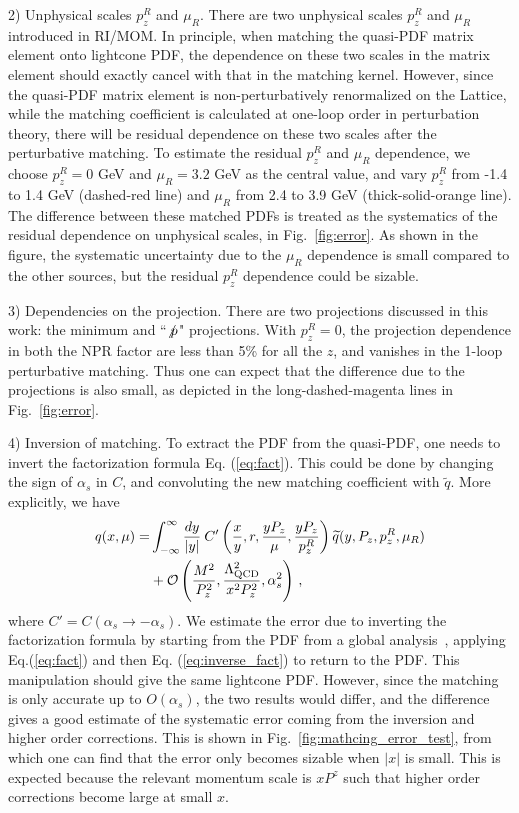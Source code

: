  {2) Unphysical scales $p_z^R$ and $\mu_R$. There are two unphysical scales $p_z^R$ and $\mu_R$ introduced in RI/MOM.  In principle, when matching the quasi-PDF matrix element onto lightcone PDF, the dependence on these two scales  in the matrix element   should exactly  cancel with that in the matching kernel.  However, since the quasi-PDF matrix element is non-perturbatively renormalized  on the Lattice, while the matching coefficient is  calculated at one-loop order in perturbation theory, there will be residual dependence on these two scales after the perturbative matching. To estimate the residual $p_z^R$ and $\mu_R$ dependence, we choose   {$p_z^R=0$ GeV and $\mu_R=3.2$ GeV} as the central value,  and vary $p_z^R$ from -1.4 to 1.4 GeV (dashed-red line) and $\mu_R$ from 2.4 to 3.9 GeV (thick-solid-orange line). The   difference between  these matched PDFs is treated  as the systematics of the residual dependence on unphysical scales, in Fig.~\ref{fig:error}. As shown in the figure, the systematic uncertainty due to the $\mu_R$ dependence is small compared  to the other sources, but the residual $p_z^R$ dependence could be sizable.}

 {3) Dependencies on the projection. There are two projections discussed in this work:  the minimum and ``$\slashed p$" projections.  With $p_z^R=0$, the projection dependence in both the NPR factor are less than 5\%  for all the $z$, and vanishes in the 1-loop perturbative matching.  Thus one can expect that the difference due to the projections is also small, as depicted  in the long-dashed-magenta lines in Fig.~\ref{fig:error}.}




4) Inversion of matching. To extract the PDF from the quasi-PDF, one needs to invert the factorization formula Eq. (\ref{eq:fact}). This could be done by   changing the sign of $\alpha_s$ in $C$,  and convoluting the new matching coefficient with $\widetilde{q}$. More explicitly, we  have
\begin{align}\label{eq:inverse_fact}
q(x,\mu)=&\int_{-\infty}^\infty {dy\over |y|}\: C'\left({x\over y},r,\frac{yP_z}{\mu},\frac{yP_z}{p_z^R}\right)\widetilde{q}(y,P_z, p^R_z,\mu_R)\nonumber\\
&+\mathcal{O}\left({M^2\over P_z^2},{\Lambda_{\text{QCD}}^2\over x^2 P_z^2},\alpha_s^2\right)\,,
\end{align}
where $C'=C(\alpha_s\to-\alpha_s)$. We estimate the error due to inverting the factorization formula  by  {starting from the PDF from a global analysis~\cite{Dulat:2015mca}, applying Eq.(\ref{eq:fact}) and then Eq. (\ref{eq:inverse_fact}) to return to the PDF. This manipulation should give the same lightcone PDF}. However, since the matching  is   only accurate up to $O(\alpha_s)$, the two results would  differ, and the difference gives a good estimate of the systematic error coming from the inversion and higher order corrections. This is shown in Fig.~\ref{fig:mathcing_error_test}, from which one can find   that the error only  becomes sizable  when $|x|$ is small.  {This is expected because the relevant momentum scale is $xP^z$ such that higher order corrections become large at small $x$}.

